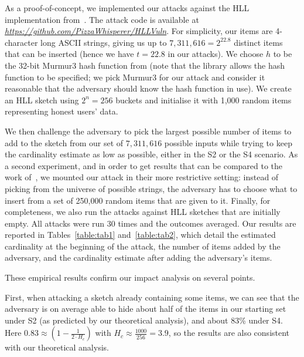 \documentclass[11pt]{article}
\newcommand{\mathilde}[1]{\todo[inline]{\textbf{Mathilde:} #1}\xspace}
\newcommand{\kenny}[1]{\todo[inline]{\textbf{Kenny:} #1}\xspace}
\begin{document}
As a proof-of-concept, we implemented our attacks against the HLL implementation from~\cite{clahll}. The attack code is available at \href{https://github.com/PizzaWhisperer/HLLVuln}{\textit{\url{https://github.com/PizzaWhisperer/HLLVuln}}}. For simplicity, our items are 4-character long ASCII strings, giving us up to $7,311,616= 2^{22.8}$ distinct items that can be inserted (hence we have $t=22.8$ in our attacks). We choose $h$ to be the 32-bit Murmur3 hash function from \cite{murmur3code} (note that the library allows the hash function to be specified; we pick Murmur3 for our attack and consider it reasonable that the adversary should know the hash function in use).
We create an HLL sketch using $2^n = 256$ buckets and initialise it with 1,000 random items representing honest users' data.

We then challenge the adversary to pick the largest possible number of items to add to the sketch from our set of  $7,311,616$ possible inputs while trying to keep the cardinality estimate as low as possible, either in the S2 or the S4 scenario. As a second experiment, and in order to get results that can be compared to the work of~\cite{hllvuln}, we mounted our attack in their more restrictive setting: instead of picking from the universe of possible strings, the adversary has to choose what to insert from a set of 250,000 random items that are given to it. Finally, for completeness, we also run the attacks against HLL sketches that are initially empty. All attacks were run 30 times and the outcomes averaged. Our results are reported in Tables~\ref{table:tab1} and~\ref{table:tab2}, which detail the estimated cardinality at the beginning of the attack, the number of items added by the adversary, and the cardinality estimate after adding the adversary's items.

These empirical results confirm our impact analysis on several points.

First, when attacking a sketch already containing some items, we can see that the adversary is on average able to hide about half of the items in our starting set under S2 (as predicted by our theoretical analysis), and about 83\% under S4. %
Here $0.83 \approx (1-\frac{1}{2\cdot H_c})$ with $H_c\approx\frac{1000}{256}=3.9$, so the results are also consistent with our theoretical analysis.
\end{document}
